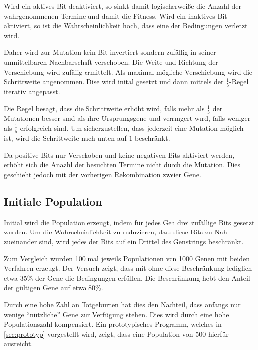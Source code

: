 Wird ein aktives Bit deaktiviert, so sinkt damit logischerweiße die Anzahl der wahrgenommenen Termine und damit die Fitness.
Wird ein inaktives Bit aktiviert, so ist die Wahrscheinlichkeit hoch, dass eine der Bedingungen verletzt wird.

Daher wird zur Mutation kein Bit invertiert sondern zufällig in seiner unmittelbaren Nachbarschaft verschoben.
Die Weite und Richtung der Verschiebung wird zufäiig ermittelt. Als maximal mögliche Verschiebung wird die Schrittweite angenommen.
Dise wird inital gesetzt und dann mittels der $\frac{1}{5}$-Regel iterativ angepasst.

Die Regel besagt, dass die Schrittweite erhöht wird, falls mehr als $\frac{1}{5}$ der Mutationen besser sind als ihre Ursprungsgene
und verringert wird, falls weniger als $\frac{1}{5}$ erfolgreich sind.
Um sicherzustellen, dass jederzeit eine Mutation möglich ist, wird die Schrittweite nach unten auf $1$ beschränkt.

Da positive Bits nur Verschoben und keine negativen Bits aktiviert werden,
erhöht sich die Anazhl der besuchten Termine nicht durch die Mutation.
Dies geschieht jedoch mit der vorherigen Rekombination zweier Gene.

\subsection{Initiale Population}
Initial wird die Population erzeugt,
indem für jedes Gen drei zufällige Bits gesetzt werden.
Um die Wahrscheinlichkeit zu reduzieren, dass diese Bits zu Nah zueinander sind,
wird jedes der Bits auf ein Drittel des Genstrings beschränkt.

Zum Vergleich wurden 100 mal jeweils Populationen von 1000 Genen mit beiden Verfahren erzeugt.
Der Versuch zeigt, dass mit ohne diese Beschränkung lediglich etwa 35\% der Gene die Bedingungen erfüllen.
Die Beschränkung hebt den Anteil der gültigen Gene auf etwa 80\%.

Durch eine hohe Zahl an Totgeburten hat dies den Nachteil,
dass anfangs nur wenige \enquote{nützliche} Gene zur Verfügung stehen.
Dies wird durch eine hohe Populationszahl kompensiert.
Ein prototypisches Programm, welches in \autoref{sec:prototyp} vorgestellt wird,
zeigt, dass eine Population von 500 hierfür ausreicht.

